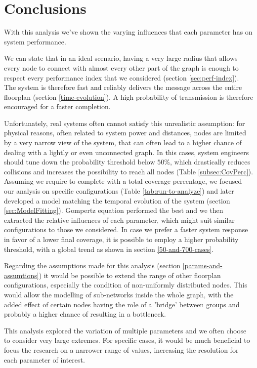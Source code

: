 \section{Conclusions}
With this analysis we've shown the varying influences that each parameter has on system performance. 

We can state that in an ideal scenario, having a very large radius that allows every node to connect with almost every other part of the graph is  enough to respect every performance index that we considered (section \ref{sec:perf-index}). The system is therefore fast and reliably delivers the message across the entire floorplan (section \ref{time-evolution}). A high probability of transmission is therefore encouraged for a faster completion.

Unfortunately, real systems often cannot satisfy this unrealistic assumption: for physical reasons, often related to system power and distances, nodes are limited by a very narrow view of the system, that can often lead to a higher chance of dealing with a lightly or even unconnected graph. In this cases, system engineers should tune down the probability threshold below $50\%$, which drastically reduces collisions and increases the possibility to reach all nodes (Table \ref{subsec:CovPerc}). Assuming we require to complete with a total coverage percentage, we focused our analysis on specific configurations (Table \ref{tab:run-to-analyze}) and later developed a model matching the temporal evolution of the system (section \ref{sec:ModelFitting}). Gompertz equation performed the best and we then extracted the relative influences of each parameter, which might suit similar configurations to those we considered. In case we prefer a faster system response in favor of a lower final coverage, it is possible to employ a higher probability threshold, with a global trend as shown in section \ref{50-and-700-cases}.

Regarding the assumptions made for this analysis (section \ref{params-and-assumtions}) it would be possible to extend the range of other floorplan configurations, especially the condition of non-uniformly distributed nodes. This would allow the modelling of sub-networks inside the whole graph, with the added effect of certain nodes having the role of a 'bridge' between groups and probably a higher chance of resulting in a bottleneck.

This analysis explored the variation of multiple parameters and we often choose to consider very large extremes. For specific cases, it would be much beneficial to focus the research on a narrower range of values, increasing the resolution for each parameter of interest.